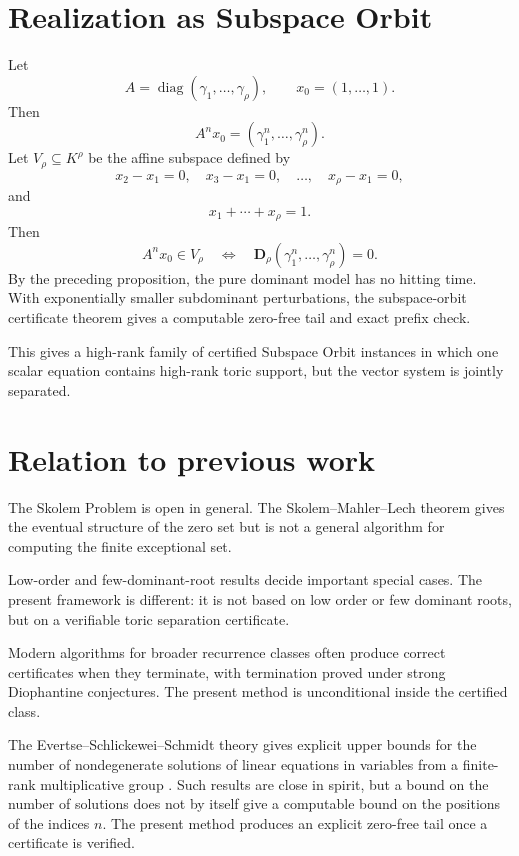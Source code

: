 \documentclass[11pt]{article}
\begin{document}
\section{Realization as Subspace Orbit}

Let
\[
A=\operatorname{diag}(\gamma_1,\ldots,\gamma_\rho),
\qquad
x_0=(1,\ldots,1).
\]
Then
\[
A^nx_0=(\gamma_1^n,\ldots,\gamma_\rho^n).
\]
Let \(V_\rho\subseteq K^\rho\) be the affine subspace defined by
\[
x_2-x_1=0,\quad
x_3-x_1=0,\quad\ldots,\quad x_\rho-x_1=0,
\]
and
\[
x_1+\cdots+x_\rho=1.
\]
Then
\[
A^nx_0\in V_\rho
\quad\Longleftrightarrow\quad
\mathbf D_\rho(\gamma_1^n,\ldots,\gamma_\rho^n)=0.
\]
By the preceding proposition, the pure dominant model has no hitting time. With exponentially smaller subdominant perturbations, the subspace-orbit certificate theorem gives a computable zero-free tail and exact prefix check.

This gives a high-rank family of certified Subspace Orbit instances in which one scalar equation contains high-rank toric support, but the vector system is jointly separated.

\section{Relation to previous work}

The Skolem Problem is open in general. The Skolem--Mahler--Lech theorem gives the eventual structure of the zero set but is not a general algorithm for computing the finite exceptional set.

Low-order and few-dominant-root results decide important special cases. The present framework is different: it is not based on low order or few dominant roots, but on a verifiable toric separation certificate.

Modern algorithms for broader recurrence classes often produce correct certificates when they terminate, with termination proved under strong Diophantine conjectures. The present method is unconditional inside the certified class.

The Evertse--Schlickewei--Schmidt theory gives explicit upper bounds for the number of nondegenerate solutions of linear equations in variables from a finite-rank multiplicative group \cite{ESS}. Such results are close in spirit, but a bound on the number of solutions does not by itself give a computable bound on the positions of the indices \(n\). The present method produces an explicit zero-free tail once a certificate is verified.
\end{document}
